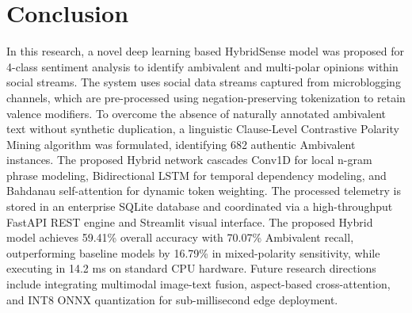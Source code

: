 \documentclass[conference]{IEEEtran}
\begin{document}
\section{Conclusion}
In this research, a novel deep learning based HybridSense model was proposed for 4-class sentiment analysis to identify ambivalent and multi-polar opinions within social streams. The system uses social data streams captured from microblogging channels, which are pre-processed using negation-preserving tokenization to retain valence modifiers. To overcome the absence of naturally annotated ambivalent text without synthetic duplication, a linguistic Clause-Level Contrastive Polarity Mining algorithm was formulated, identifying 682 authentic Ambivalent instances. The proposed Hybrid network cascades Conv1D for local n-gram phrase modeling, Bidirectional LSTM for temporal dependency modeling, and Bahdanau self-attention for dynamic token weighting. The processed telemetry is stored in an enterprise SQLite database and coordinated via a high-throughput FastAPI REST engine and Streamlit visual interface. The proposed Hybrid model achieves 59.41\% overall accuracy with 70.07\% Ambivalent recall, outperforming baseline models by 16.79\% in mixed-polarity sensitivity, while executing in 14.2 ms on standard CPU hardware. Future research directions include integrating multimodal image-text fusion, aspect-based cross-attention, and INT8 ONNX quantization for sub-millisecond edge deployment.
\end{document}
